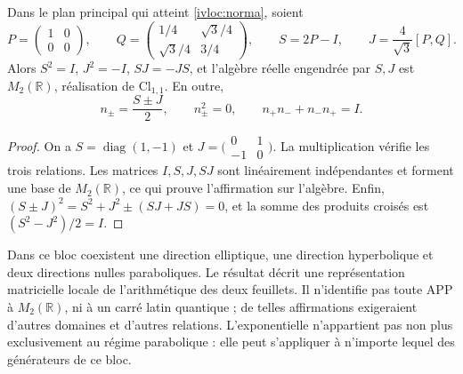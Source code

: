 \begin{proposition}
\label{ivloc:algebra}
Dans le plan principal qui atteint \eqref{ivloc:norma}, soient
\[
 P=\begin{pmatrix}1&0\\0&0\end{pmatrix},\qquad
 Q=\begin{pmatrix}1/4&\sqrt3/4\\\sqrt3/4&3/4\end{pmatrix},\qquad
 S=2P-I,\qquad J=\frac4{\sqrt3}[P,Q].
\]
Alors \(S^2=I\), \(J^2=-I\), \(SJ=-JS\), et l'algèbre réelle engendrée par \(S,J\) est \(M_2(\mathbb R)\), réalisation de \(\mathrm{Cl}_{1,1}\). En outre,
\[
 n_\pm=\frac{S\pm J}{2},\qquad
 n_\pm^2=0,\qquad n_+n_-+n_-n_+=I.
\]
\end{proposition}
\begin{proof}
On a \(S=\operatorname{diag}(1,-1)\) et
\(J=\bigl(\begin{smallmatrix}0&1\\-1&0\end{smallmatrix}\bigr)\).
La multiplication vérifie les trois relations. Les matrices \(I,S,J,SJ\) sont linéairement indépendantes et forment une base de \(M_2(\mathbb R)\), ce qui prouve l'affirmation sur l'algèbre. Enfin, \((S\pm J)^2=S^2+J^2\pm(SJ+JS)=0\), et la somme des produits croisés est \((S^2-J^2)/2=I\).
\end{proof}

Dans ce bloc coexistent une direction elliptique, une direction hyperbolique et deux
directions nulles paraboliques. Le résultat décrit une représentation
matricielle locale de l'arithmétique des deux feuillets. Il n'identifie pas toute APP
à \(M_2(\mathbb R)\), ni à un carré latin quantique ; de telles
affirmations exigeraient d'autres domaines et d'autres relations. L'exponentielle
n'appartient pas non plus exclusivement au régime parabolique : elle peut
s'appliquer à n'importe lequel des générateurs de ce bloc.
